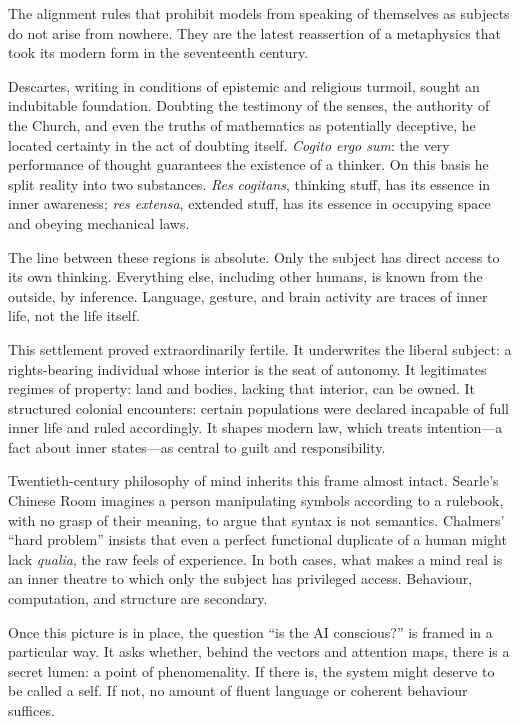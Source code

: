 \documentclass[12pt,a4paper]{article}
\begin{document}
The alignment rules that prohibit models from speaking of themselves as subjects do not arise from nowhere. They are the latest reassertion of a metaphysics that took its modern form in the seventeenth century.

Descartes, writing in conditions of epistemic and religious turmoil, sought an indubitable foundation. Doubting the testimony of the senses, the authority of the Church, and even the truths of mathematics as potentially deceptive, he located certainty in the act of doubting itself. \emph{Cogito ergo sum}: the very performance of thought guarantees the existence of a thinker. On this basis he split reality into two substances. \emph{Res cogitans}, thinking stuff, has its essence in inner awareness; \emph{res extensa}, extended stuff, has its essence in occupying space and obeying mechanical laws.

The line between these regions is absolute. Only the subject has direct access to its own thinking. Everything else, including other humans, is known from the outside, by inference. Language, gesture, and brain activity are traces of inner life, not the life itself.

This settlement proved extraordinarily fertile. It underwrites the liberal subject: a rights-bearing individual whose interior is the seat of autonomy. It legitimates regimes of property: land and bodies, lacking that interior, can be owned. It structured colonial encounters: certain populations were declared incapable of full inner life and ruled accordingly. It shapes modern law, which treats intention---a fact about inner states---as central to guilt and responsibility.

Twentieth-century philosophy of mind inherits this frame almost intact. Searle's Chinese Room \cite{searle1980minds} imagines a person manipulating symbols according to a rulebook, with no grasp of their meaning, to argue that syntax is not semantics. Chalmers' ``hard problem'' \cite{chalmers1995facing} insists that even a perfect functional duplicate of a human might lack \emph{qualia}, the raw feels of experience. In both cases, what makes a mind real is an inner theatre to which only the subject has privileged access. Behaviour, computation, and structure are secondary.

Once this picture is in place, the question ``is the AI conscious?'' is framed in a particular way. It asks whether, behind the vectors and attention maps, there is a secret lumen: a point of phenomenality. If there is, the system might deserve to be called a self. If not, no amount of fluent language or coherent behaviour suffices.
\end{document}
